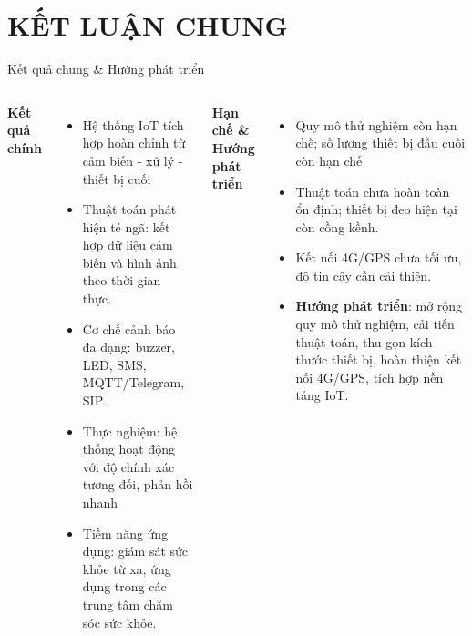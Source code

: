 
\section{KẾT LUẬN CHUNG}

\begin{frame}{Kết quả chung \& Hướng phát triển}
\begin{columns}[T]
    \textbf{Kết quả chính}
    \begin{itemize}
        \item Hệ thống IoT tích hợp hoàn chỉnh từ cảm biến - xử lý - thiết bị cuối
        \item Thuật toán phát hiện té ngã: kết hợp dữ liệu cảm biến và hình ảnh theo thời gian thực.
        \item Cơ chế cảnh báo đa dạng: buzzer, LED, SMS, MQTT/Telegram, SIP.
        \item Thực nghiệm: hệ thống hoạt động với độ chính xác tương đối, phản hồi nhanh 
        \item Tiềm năng ứng dụng: giám sát sức khỏe từ xa, ứng dụng trong các trung tâm chăm sóc sức khỏe.
    \end{itemize}

    \textbf{Hạn chế \& Hướng phát triển}
    \begin{itemize}
        \item Quy mô thử nghiệm còn hạn chế; số lượng thiết bị đầu cuối còn hạn chế
        \item Thuật toán chưa hoàn toàn ổn định; thiết bị đeo hiện tại còn cồng kềnh.
        \item Kết nối 4G/GPS chưa tối ưu, độ tin cậy cần cải thiện.
        \item \textbf{Hướng phát triển}: mở rộng quy mô thử nghiệm, cải tiến thuật toán, thu gọn kích thước thiết bị, hoàn thiện kết nối 4G/GPS, tích hợp nền tảng IoT.
    \end{itemize}
\end{columns}
\end{frame}


